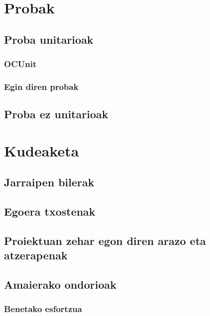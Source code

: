 \section{Probak}

\subsection{Proba unitarioak}

\subsubsection{OCUnit}

\subsubsection{Egin diren probak}

\subsection{Proba ez unitarioak}

\section{Kudeaketa}

\subsection{Jarraipen bilerak}

\subsection{Egoera txostenak}

\subsection{Proiektuan zehar egon diren arazo eta atzerapenak}

\subsection{Amaierako ondorioak}

\subsubsection{Benetako esfortzua}
